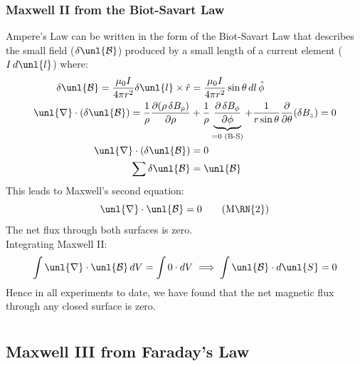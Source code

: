 \documentclass[a4paper, 11pt, normalem]{report}
\newcommand\p{\partial}
\newcommand\B{\mathcal{B}}
\newcommand\uB{\unl{\B}}
\newcommand\del{\unl{\nabla}}
\newcommand\hr{\hat{r}}
\begin{document}
\subsection{Maxwell \RN{2} from the Biot-Savart Law}
Ampere's Law can be written in the form of the Biot-Savart Law that describes the small field ($\delta\uB$) produced by a small length of a current element ($I\,d\unl{l}$) where:
\begin{align}
    \delta \uB = \frac{\mu_0 I}{4\pi r^2}\delta\unl{l} \times \hr &= \frac{\mu_0 I}{4\pi r^2}\sin\theta\,dl\,\hat{\phi} \\
    \del \cdot (\delta\uB) = \frac{1}{\rho}\frac{\p(\rho\,\delta B_\rho)}{\p \rho} &+ \frac{1}{\rho}\underbrace{\frac{\p\, \delta B_\phi}{\p \phi}}_{= 0 \text{ (B-S)}} + \frac{1}{r\sin\theta} \frac{\p}{\p \theta}(\delta B_z) = 0 \\
    \del\cdot(\delta\uB) &= 0 \\
    \sum \delta\uB &= \uB
\end{align}
This leads to Maxwell's second equation:
\begin{equation}
    \del\cdot\uB = 0 \tag{M\RN{2}}
\end{equation}
The net flux through both surfaces is zero. \\
Integrating Maxwell \RN{2}:
\begin{equation}
    \int \del\cdot\uB\,dV = \int 0\cdot dV \implies \int \uB\cdot d\unl{S} = 0
\end{equation}
Hence in all experiments to date, we have found that the net magnetic flux through any closed surface is zero.

\chapter{}
\section{Maxwell \RN{3} from Faraday's Law}
\end{document}
